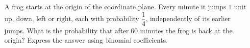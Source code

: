 A frog starts at the origin of the coordinate plane. Every minute it jumps $1$ unit up, down, left or right, each with probability $\dfrac14$, independently of its earlier jumps. What is the probability that after $60$ minutes the frog is back at the origin? Express the answer using binomial coefficients.
